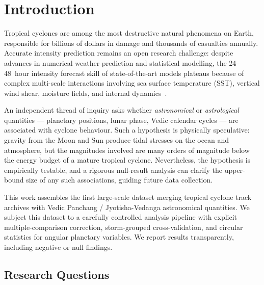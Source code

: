 \documentclass[12pt,a4paper]{article}
\begin{document}
\tableofcontents
\newpage

\section{Introduction}

Tropical cyclones are among the most destructive natural phenomena on Earth,
responsible for billions of dollars in damage and thousands of casualties annually.
Accurate intensity prediction remains an open research challenge: despite advances
in numerical weather prediction and statistical modelling, the 24--48~hour intensity
forecast skill of state-of-the-art models plateaus because of complex multi-scale
interactions involving sea surface temperature (SST), vertical wind shear, moisture
fields, and internal dynamics~\citep{demaria2014advances,zhang2018tropical}.

An independent thread of inquiry asks whether \emph{astronomical} or
\emph{astrological} quantities --- planetary positions, lunar phase, Vedic calendar
cycles --- are associated with cyclone behaviour. Such a hypothesis is physically
speculative: gravity from the Moon and Sun produce tidal stresses on the ocean and
atmosphere, but the magnitudes involved are many orders of magnitude below the
energy budget of a mature tropical cyclone.
Nevertheless, the hypothesis is empirically testable, and a rigorous null-result
analysis can clarify the upper-bound size of any such associations, guiding
future data collection.

This work assembles the first large-scale dataset merging tropical cyclone track
archives with Vedic Panchang / Jyotisha-Vedanga astronomical quantities. We subject
this dataset to a carefully controlled analysis pipeline with explicit
multiple-comparison correction, storm-grouped cross-validation, and circular
statistics for angular planetary variables. We report results transparently,
including negative or null findings.

\subsection{Research Questions}
\end{document}
